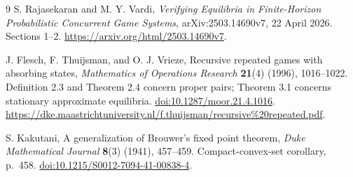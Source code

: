 \documentclass[11pt]{article}
\begin{document}
\begin{thebibliography}{9}
S. Rajasekaran and M. Y. Vardi,
\emph{Verifying Equilibria in Finite-Horizon Probabilistic Concurrent Game
Systems}, arXiv:2503.14690v7, 22 April 2026.
Sections 1--2.
\url{https://arxiv.org/html/2503.14690v7}.

J. Flesch, F. Thuijsman, and O. J. Vrieze,
Recursive repeated games with absorbing states,
\emph{Mathematics of Operations Research} \textbf{21}(4) (1996), 1016--1022.
Definition 2.3 and Theorem 2.4 concern proper pairs; Theorem 3.1 concerns
stationary approximate equilibria.
\href{https://doi.org/10.1287/moor.21.4.1016}{doi:10.1287/moor.21.4.1016}.
\url{https://dke.maastrichtuniversity.nl/f.thuijsman/recursive%20repeated.pdf}.

S. Kakutani, A generalization of Brouwer's fixed point theorem,
\emph{Duke Mathematical Journal} \textbf{8}(3) (1941), 457--459.
Compact-convex-set corollary, p.~458.
\href{https://doi.org/10.1215/S0012-7094-41-00838-4}{doi:10.1215/S0012-7094-41-00838-4}.
\end{thebibliography}
\end{document}
